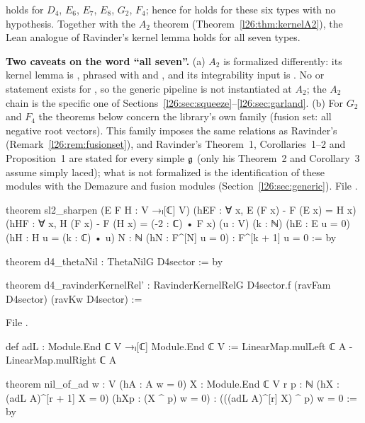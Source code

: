\begin{theorem}\label{l26:thm:thetanil}
 holds for $D_4$, $E_6$, $E_7$, $E_8$, $G_2$, $F_4$; hence  for  holds for
these six types with no hypothesis. Together with the $A_2$ theorem  (Theorem~\ref{l26:thm:kernelA2}),
the Lean analogue of Ravinder's kernel lemma holds for all seven types.
\end{theorem}
\noindent\textbf{Two caveats on the word ``all seven''.} (a) $A_2$ is formalized differently: its kernel lemma is
, phrased with  and , and its integrability input is . No
 or  statement exists for , so the generic pipeline
 is not instantiated at $A_2$; the $A_2$ chain is the specific one of
Sections~\ref{l26:sec:squeeze}--\ref{l26:sec:garland}. (b) For $G_2$ and $F_4$
the theorems below concern the library's own family  (fusion set: all negative root vectors). This family imposes the
same relations as Ravinder's (Remark~\ref{l26:rem:fusionset}), and Ravinder's Theorem~1, Corollaries~1--2 and Proposition~1 are
stated for every simple $\mathfrak g$ (only his Theorem~2 and Corollary~3 assume simply laced); what is not formalized is the
identification of these modules with the Demazure and fusion modules (Section~\ref{l26:sec:generic}).
\noindent File .
\begin{leancode}
theorem sl2_sharpen (E F H : V →ₗ[ℂ] V) (hEF : ∀ x, E (F x) - F (E x) = H x)
    (hHF : ∀ x, H (F x) - F (H x) = (-2 : ℂ) • F x) (u : V) (k : ℕ) (hE : E u = 0)
    (hH : H u = (k : ℂ) • u) {N : ℕ} (hN : F^[N] u = 0) : F^[k + 1] u = 0 := by

theorem d4_thetaNil : ThetaNilG D4sector := by

theorem d4_ravinderKernelRel' : RavinderKernelRelG D4sector.f (ravFam D4sector) (ravKw D4sector) :=
\end{leancode}
\noindent File .
\begin{leancode}
def adL : Module.End ℂ V →ₗ[ℂ] Module.End ℂ V := LinearMap.mulLeft ℂ A - LinearMap.mulRight ℂ A

theorem nil_of_ad {w : V} (hA : A w = 0) {X : Module.End ℂ V} {r p : ℕ}
    (hX : (adL A)^[r + 1] X = 0) (hXp : (X ^ p) w = 0) : (((adL A)^[r] X) ^ p) w = 0 := by
\end{leancode}
